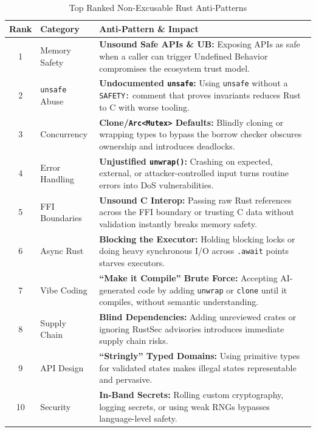 \begin{table}[htbp]
    \centering
    \caption{Top Ranked Non-Excusable Rust Anti-Patterns}
    \label{tab:bad_rust_top_issues}
    \renewcommand{\arraystretch}{1.3}
    \begin{tabular}{|c|l|p{8.5cm}|}
        \hline
        \textbf{Rank} & \textbf{Category} & \textbf{Anti-Pattern \& Impact} \\
        \hline
        1 & Memory Safety & \textbf{Unsound Safe APIs \& UB:} Exposing APIs as safe when a caller can trigger Undefined Behavior compromises the ecosystem trust model. \\
        \hline
        2 & \texttt{unsafe} Abuse & \textbf{Undocumented \texttt{unsafe}:} Using \texttt{unsafe} without a \texttt{SAFETY:} comment that proves invariants reduces Rust to C with worse tooling. \\
        \hline
        3 & Concurrency & \textbf{Clone/\texttt{Arc<Mutex>} Defaults:} Blindly cloning or wrapping types to bypass the borrow checker obscures ownership and introduces deadlocks. \\
        \hline
        4 & Error Handling & \textbf{Unjustified \texttt{unwrap()}:} Crashing on expected, external, or attacker-controlled input turns routine errors into DoS vulnerabilities. \\
        \hline
        5 & FFI Boundaries & \textbf{Unsound C Interop:} Passing raw Rust references across the FFI boundary or trusting C data without validation instantly breaks memory safety. \\
        \hline
        6 & Async Rust & \textbf{Blocking the Executor:} Holding blocking locks or doing heavy synchronous I/O across \texttt{.await} points starves executors. \\
        \hline
        7 & Vibe Coding & \textbf{``Make it Compile'' Brute Force:} Accepting AI-generated code by adding \texttt{unwrap} or \texttt{clone} until it compiles, without semantic understanding. \\
        \hline
        8 & Supply Chain & \textbf{Blind Dependencies:} Adding unreviewed crates or ignoring RustSec advisories introduces immediate supply chain risks. \\
        \hline
        9 & API Design & \textbf{``Stringly'' Typed Domains:} Using primitive types for validated states makes illegal states representable and pervasive. \\
        \hline
        10 & Security & \textbf{In-Band Secrets:} Rolling custom cryptography, logging secrets, or using weak RNGs bypasses language-level safety. \\
        \hline
    \end{tabular}
\end{table}

